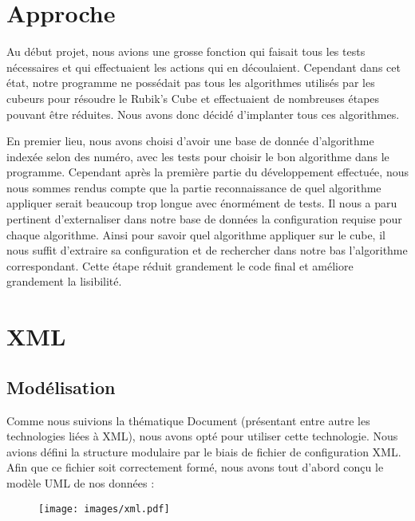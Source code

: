 \section{Approche}
Au début projet, nous avions une grosse fonction qui faisait tous les tests nécessaires et qui effectuaient les actions qui en découlaient. Cependant dans cet état, notre programme ne possédait pas tous les algorithmes utilisés par les cubeurs pour résoudre le Rubik's Cube et effectuaient de nombreuses étapes pouvant être réduites. Nous avons donc décidé d'implanter tous ces algorithmes.


En premier lieu, nous avons choisi d'avoir une base de donnée d'algorithme indexée selon des numéro, avec les tests pour choisir le bon algorithme dans le programme. Cependant après la première partie du développement effectuée, nous nous sommes rendus compte que la partie reconnaissance de quel algorithme appliquer serait beaucoup trop longue avec énormément de tests. Il nous a paru pertinent d'externaliser dans notre base de données la configuration requise pour chaque algorithme. Ainsi pour savoir quel algorithme appliquer sur le cube, il nous suffit d'extraire sa configuration et de rechercher dans notre bas l'algorithme correspondant. Cette étape réduit grandement le code final et améliore grandement la lisibilité.

\section{XML}
\subsection{Modélisation}
Comme nous suivions la thématique Document (présentant entre autre les technologies liées à XML), nous avons opté pour utiliser cette technologie. Nous avions défini la structure modulaire par le biais de fichier de configuration XML. Afin que ce fichier soit correctement formé, nous avons tout d'abord conçu le modèle UML de nos données :
\newpage
\begin{figure}[!h]
\begin{center}
\texttt{[image: images/xml.pdf]}
\end{center}
\end{figure}

